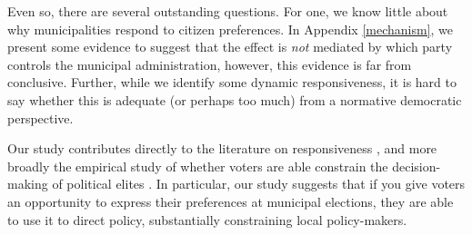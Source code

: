 \documentclass[a4paper,12pt]{article}
\begin{document}
Even so, there are several outstanding questions. For one, we know little about why municipalities respond to citizen preferences. In Appendix \ref{mechanism}, we present some evidence to suggest that the effect is \textit{not} mediated by which party controls the municipal administration, however, this evidence is far from conclusive. Further, while we identify some dynamic responsiveness, it is hard to say whether this is adequate (or perhaps too much) from a normative democratic perspective.

Our study contributes directly to the literature on responsiveness \citep{tausanovitch2014representation}, and more broadly the empirical study of whether voters are able constrain the decision-making of political elites \citep{berry2009imperfect}. In particular, our study suggests that if you give voters an opportunity to express their preferences at municipal elections, they are able to use it to direct policy, substantially constraining local policy-makers.





\onehalfspacing



\clearpage

\renewcommand{\thesubsection}{\Alph{subsection}}
\renewcommand{\thetable}{\Alph{subsection}\arabic{table}}
\renewcommand{\thefigure}{\Alph{subsection}\arabic{figure}}
\end{document}
